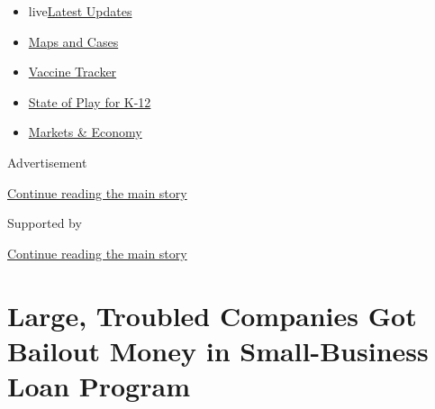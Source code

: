 \begin{itemize}
\tightlist
\item
  live\href{https://www.nytimes3xbfgragh.onion/2020/08/17/world/coronavirus-covid.html?name=styln-coronavirus-markets\&region=TOP_BANNER\&variant=undefined\&block=storyline_menu_recirc\&action=click\&pgtype=Article\&impression_id=0c3bba11-e0fd-11ea-bca3-17fca13c9abe}{Latest
  Updates}
\item
  \href{https://www.nytimes3xbfgragh.onion/interactive/2020/us/coronavirus-us-cases.html?name=styln-coronavirus-markets\&region=TOP_BANNER\&variant=undefined\&block=storyline_menu_recirc\&action=click\&pgtype=Article\&impression_id=0c3bba12-e0fd-11ea-bca3-17fca13c9abe}{Maps
  and Cases}
\item
  \href{https://www.nytimes3xbfgragh.onion/interactive/2020/science/coronavirus-vaccine-tracker.html?name=styln-coronavirus-markets\&region=TOP_BANNER\&variant=undefined\&block=storyline_menu_recirc\&action=click\&pgtype=Article\&impression_id=0c3bba13-e0fd-11ea-bca3-17fca13c9abe}{Vaccine
  Tracker}
\item
  \href{https://www.nytimes3xbfgragh.onion/2020/08/17/us/k-12-schools-reopening.html?name=styln-coronavirus-markets\&region=TOP_BANNER\&variant=undefined\&block=storyline_menu_recirc\&action=click\&pgtype=Article\&impression_id=0c3bba14-e0fd-11ea-bca3-17fca13c9abe}{State
  of Play for K-12}
\item
  \href{https://www.nytimes3xbfgragh.onion/live/2020/08/17/business/stock-market-today-coronavirus?name=styln-coronavirus-markets\&region=TOP_BANNER\&variant=undefined\&block=storyline_menu_recirc\&action=click\&pgtype=Article\&impression_id=0c3bba15-e0fd-11ea-bca3-17fca13c9abe}{Markets
  \& Economy}
\end{itemize}

Advertisement

\protect\hyperlink{after-top}{Continue reading the main story}

Supported by

\protect\hyperlink{after-sponsor}{Continue reading the main story}

\hypertarget{large-troubled-companies-got-bailout-money-in-small-business-loan-program}{%
\section{Large, Troubled Companies Got Bailout Money in Small-Business
Loan
Program}\label{large-troubled-companies-got-bailout-money-in-small-business-loan-program}}

